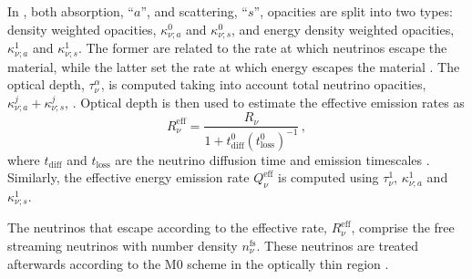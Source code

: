 %
%
In \wisky{}, both absorption, ``$a$'', and scattering, ``$s$'', opacities are split 
into two types: density weighted 
opacities, $\kappa_{\nu;a}^0$ and $\kappa_{\nu;s}^0$, and energy density 
weighted opacities, $\kappa_{\nu;a}^1$ and $\kappa_{\nu;s}^1$. 
The former are related to the rate at which neutrinos escape the material, 
while the latter set the rate at which energy escapes the material 
\citep{Ruffert:1995fs}.
%
The optical depth, $\tau_{\nu}^{\alpha}$, is computed taking into account 
total neutrino opacities, 
$\kappa_{\nu;a}^j + \kappa_{\nu;s}^j$, \citep{Neilsen:2014hha}.
%
Optical depth is then used to estimate the effective emission rates \citep{Ruffert:1995fs} as 
%
\begin{equation}
R_{\nu}^{\text{eff}} = \frac{R_{\nu}}{1 + t_{\text{diff}}^0(t^0_{\text{loss}})^{-1}}\, ,
\label{eq:method:whisky:Rnueff}
\end{equation}
%
where $t_{\text{diff}}$ and $t_{\text{loss}}$ are the neutrino diffusion time and emission timescales 
%
%
%
%
\citep{Radice:2018pdn}.
%
%
Similarly, the effective energy emission rate $Q_{\nu}^{\text{eff}}$ 
is computed using $\tau_{\nu}^1$, $\kappa_{\nu;a}^1$ and $\kappa_{\nu;s}^1$.

The neutrinos that escape according to the effective rate, $R_{\nu}^{\text{eff}}$, 
comprise the free streaming neutrinos with number density $n_{\nu}^{\text{fs}}$. 
%
These neutrinos are treated afterwards according to the 
M0 scheme in the optically thin region \citep{Radice:2016dwd}.

